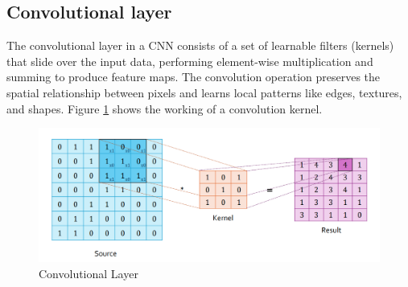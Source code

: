 \subsection{Convolutional layer}
The convolutional layer in a CNN consists of a set of learnable filters (kernels) that slide over the input data, performing element-wise multiplication and summing to produce feature maps. The convolution operation preserves the spatial relationship between pixels and learns local patterns like edges, textures, and shapes. Figure \ref{fig:Conv1} shows the working of a convolution kernel. 
\begin{figure}[ht]
    \centering
    \includegraphics[width=14cm]{images/Theory-DL/Conv1.png}
    \caption{Convolutional Layer}
    \label{fig:Conv1}
  \end{figure}
